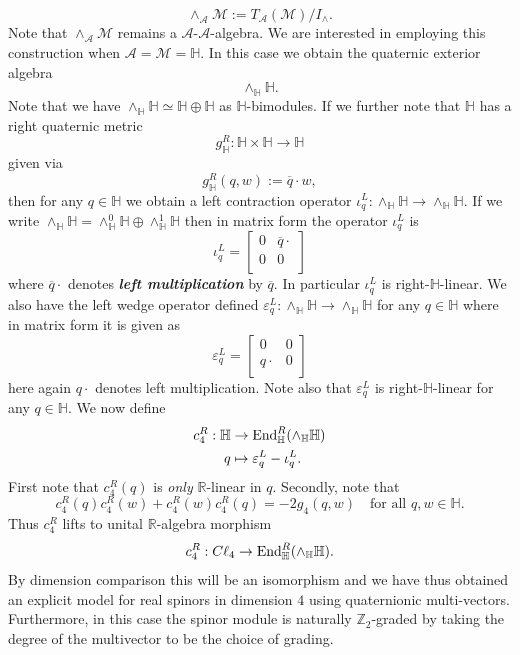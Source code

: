 \documentclass[openany, 11pt]{article}
\theoremstyle{definition}
\theoremstyle{remark}
\def\bH{\ensuremath{\mathbb{H}}}
\def\bR{\ensuremath{\mathbb{R}}}
\def\bZ{\ensuremath{\mathbb{Z}}}
\def\End{\ensuremath{\textnormal{End}}}
\begin{document}
\[
    \wedge_{\mathcal{A}}\mathcal{M}:=T_{\mathcal{A}}(\mathcal{M})/I_{\wedge}.
\]
Note that $\wedge_{\mathcal{A}}\mathcal{M}$ remains a $\mathcal{A}$-$\mathcal{A}$-algebra. We are interested in employing this construction when $\mathcal{A}=\mathcal{M}=\bH$. In this case we obtain the quaternic exterior algebra
\[
    \wedge_{\bH}\bH.
\]
Note that we have $\wedge_{\bH}\bH\simeq \bH\oplus\bH$ as $\bH$-bimodules. If we further note that $\bH$ has a right quaternic metric
\[
    g_{\bH}^R:\bH\times\bH\rightarrow\bH
\]
given via
\[
    g^R_{\bH}(q,w):=\overline{q}\cdot w,
\]
then for any $q\in\bH$ we obtain a left contraction operator $\iota^L_q:\wedge_{\bH}\bH\rightarrow\wedge_{\bH}\bH$. If we write $\wedge_{\bH}\bH=\wedge^0_{\bH}\bH\oplus\wedge^1_{\bH}\bH$ then in matrix form the operator $\iota^L_q$ is
\[
    \iota^L_q=\begin{bmatrix}
        0 & \overline{q}\cdot \\
        0 & 0 \\
    \end{bmatrix}
\]
where $\overline{q}\cdot$ denotes \textbf{\emph{left multiplication}} by $\overline{q}$. In particular $\iota^L_q$ is right-$\bH$-linear. We also have the left wedge operator defined $\varepsilon^L_q:\wedge_{\bH}\bH\rightarrow\wedge_{\bH}\bH$ for any $q\in\bH$ where in matrix form it is given as
\[
    \varepsilon^L_q=\begin{bmatrix}
        0 & 0 \\
        q\cdot & 0 \\
    \end{bmatrix}
\]
here again $q\cdot$ denotes left multiplication. Note also that $\varepsilon^L_q$ is right-$\bH$-linear for any $q\in\bH$. We now define
\begin{align*}
    c^R_4:\bH&\rightarrow \End^R_{\bH}(\wedge_{\bH}\bH)\\
    q&\mapsto \varepsilon^L_q-\iota^L_q.
\end{align*}
First note that $c^R_4(q)$ is \emph{only} $\bR$-linear in $q$. Secondly, note that 
\[
    c^R_4(q)c^R_4(w)+c^R_4(w)c^R_4(q)=-2g_4(q,w)\quad\text{for all }q,w\in\bH.
\]
Thus $c^R_4$ lifts to unital $\bR$-algebra morphism
\[
    c^R_4:C\ell_4\rightarrow\End^R_{\bH}(\wedge_{\bH}\bH).
\]
By dimension comparison this will be an isomorphism and we have thus obtained an explicit model for real spinors in dimension $4$ using quaternionic multi-vectors. Furthermore, in this case the spinor module is naturally $\bZ_2$-graded by taking the degree of the multivector to be the choice of grading.\par
\end{document}
